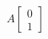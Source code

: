 \documentclass[preview]{standalone}
\begin{document}
\begin{align*}
A\begin{bmatrix} 0 \\ 1 \end{bmatrix}
\end{align*}
\end{document}
